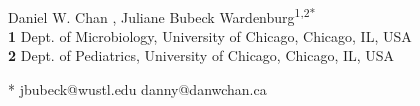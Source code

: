 \documentclass[10pt,letterpaper]{article}
\date{}
\begin{document}
\vspace*{0.2in}

\begin{flushleft}
{\Large
\textbf{} %
}
\newline
\\
Daniel W. Chan\textsuperscript{\dag} \href{https://orcid.org/0000-0002-8082-2316}{\textcolor{orcidlogocol}{\aiOrcid}},
Juliane Bubeck Wardenburg\textsuperscript{1,2*} \href{https://orcid.org/0000-0002-2755-3348}{\textcolor{orcidlogocol}{\aiOrcid}}
\\
\bigskip
\textbf{1} Dept. of Microbiology, University of Chicago, Chicago, IL, USA
\\
\textbf{2} Dept. of Pediatrics, University of Chicago, Chicago, IL, USA
\\
\bigskip

% 
%





* jbubeck@wustl.edu
\dag danny@danwchan.ca

\end{flushleft}
\end{document}
